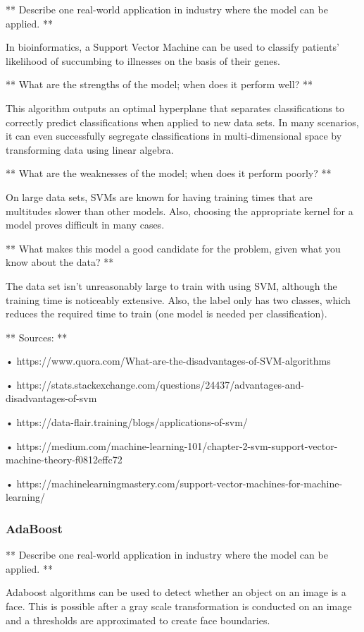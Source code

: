 \documentclass[11pt]{article}
\begin{document}
** Describe one real-world application in industry where the model can
be applied. **

In bioinformatics, a Support Vector Machine can be used to classify
patients' likelihood of succumbing to illnesses on the basis of their
genes.

** What are the strengths of the model; when does it perform well? **

This algorithm outputs an optimal hyperplane that separates
classifications to correctly predict classifications when applied to new
data sets. In many scenarios, it can even successfully segregate
classifications in multi-dimensional space by transforming data using
linear algebra.

** What are the weaknesses of the model; when does it perform poorly? **

On large data sets, SVMs are known for having training times that are
multitudes slower than other models. Also, choosing the appropriate
kernel for a model proves difficult in many cases.

** What makes this model a good candidate for the problem, given what
you know about the data? **

The data set isn't unreasonably large to train with using SVM, although
the training time is noticeably extensive. Also, the label only has two
classes, which reduces the required time to train (one model is needed
per classification).

** Sources: **

• https://www.quora.com/What-are-the-disadvantages-of-SVM-algorithms

•
https://stats.stackexchange.com/questions/24437/advantages-and-disadvantages-of-svm

• https://data-flair.training/blogs/applications-of-svm/

•
https://medium.com/machine-learning-101/chapter-2-svm-support-vector-machine-theory-f0812effc72

•
https://machinelearningmastery.com/support-vector-machines-for-machine-learning/

\hypertarget{adaboost}{%
\subsubsection{AdaBoost}\label{adaboost}}

** Describe one real-world application in industry where the model can
be applied. **

Adaboost algorithms can be used to detect whether an object on an image
is a face. This is possible after a gray scale transformation is
conducted on an image and a thresholds are approximated to create face
boundaries.
\end{document}
